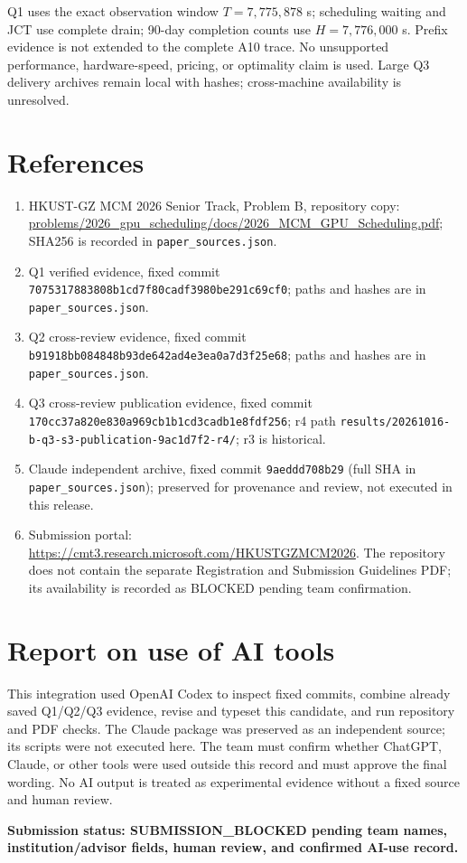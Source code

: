 Q1 uses the exact observation window $T=7,775,878$ s; scheduling waiting and JCT use complete drain; 90-day completion counts use $H=7,776,000$ s. Prefix evidence is not extended to the complete A10 trace. No unsupported performance, hardware-speed, pricing, or optimality claim is used. Large Q3 delivery archives remain local with hashes; cross-machine availability is unresolved.

\section*{References}
\sloppy
\begin{enumerate}
\item HKUST-GZ MCM 2026 Senior Track, Problem B, repository copy: \url{problems/2026_gpu_scheduling/docs/2026_MCM_GPU_Scheduling.pdf}; SHA256 is recorded in \texttt{paper\_sources.json}.
\item Q1 verified evidence, fixed commit \texttt{7075317883808b1cd7f80cadf3980be291c69cf0}; paths and hashes are in \texttt{paper\_sources.json}.
\item Q2 cross-review evidence, fixed commit \texttt{b91918bb084848b93de642ad4e3ea0a7d3f25e68}; paths and hashes are in \texttt{paper\_sources.json}.
\item Q3 cross-review publication evidence, fixed commit \texttt{170cc37a820e830a969cb1b1cd3cadb1e8fdf256}; r4 path \texttt{results/20261016-b-q3-s3-publication-9ac1d7f2-r4/}; r3 is historical.
\item Claude independent archive, fixed commit \texttt{9aeddd708b29} (full SHA in \texttt{paper\_sources.json}); preserved for provenance and review, not executed in this release.
\item Submission portal: \url{https://cmt3.research.microsoft.com/HKUSTGZMCM2026}. The repository does not contain the separate Registration and Submission Guidelines PDF; its availability is recorded as BLOCKED pending team confirmation.
\end{enumerate}

\clearpage
\section*{Report on use of AI tools}
This integration used OpenAI Codex to inspect fixed commits, combine already saved Q1/Q2/Q3 evidence, revise and typeset this candidate, and run repository and PDF checks. The Claude package was preserved as an independent source; its scripts were not executed here. The team must confirm whether ChatGPT, Claude, or other tools were used outside this record and must approve the final wording. No AI output is treated as experimental evidence without a fixed source and human review.

\textbf{Submission status: SUBMISSION\_BLOCKED pending team names, institution/advisor fields, human review, and confirmed AI-use record.}

